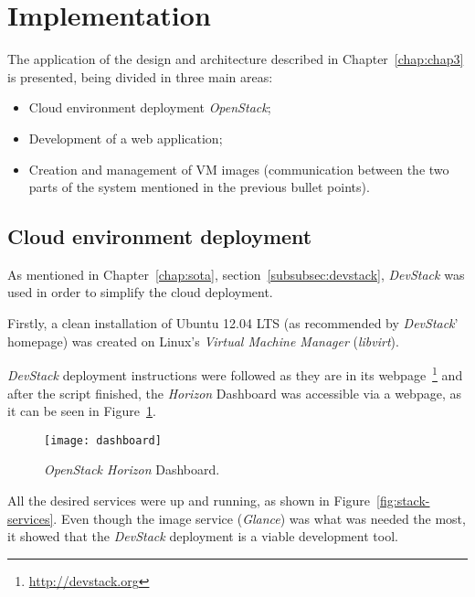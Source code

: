 \section{Implementation}\label{sec:implementation}


The application of the design and architecture described in Chapter~\ref{chap:chap3} is presented, being divided in three main areas:

\begin{itemize}
\item Cloud environment deployment \textit{OpenStack};
\item Development of a web application;
\item Creation and management of VM images (communication between the two parts of the system mentioned in the previous bullet points).
\end{itemize}

\subsection{Cloud environment deployment}\label{subsec:cloud_env}

As mentioned in Chapter~\ref{chap:sota}, section~\ref{subsubsec:devstack}, \textit{DevStack} was used in order to simplify the cloud deployment.

Firstly, a clean installation of Ubuntu 12.04 LTS (as recommended by \textit{DevStack}' homepage) was created on Linux's \textit{Virtual Machine Manager} (\textit{libvirt}).

\textit{DevStack} deployment instructions were followed as they are in its webpage~\footnote{\url{http://devstack.org}} and after the script finished, the \textit{Horizon} Dashboard was accessible via a webpage, as it can be seen in Figure~\ref{fig:stack-dashboard}.

\begin{figure}[t]
  \begin{center}
    \leavevmode
    \texttt{[image: dashboard]}
    \caption{\textit{OpenStack Horizon} Dashboard.}
    \label{fig:stack-dashboard}
  \end{center}
\end{figure}

All the desired services were up and running, as shown in Figure~\ref{fig:stack-services}. Even though the image service (\textit{Glance}) was what was needed the most, it showed that the \textit{DevStack} deployment is a viable development tool.

